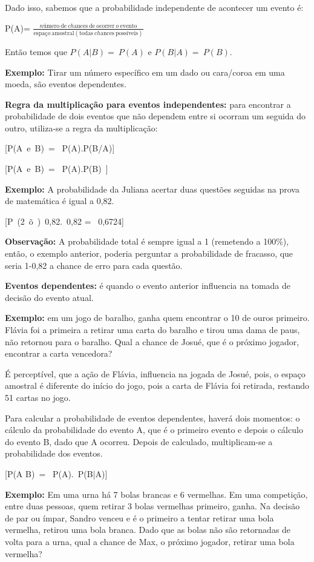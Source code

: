 Dado isso, sabemos que a probabilidade independente de acontecer um
evento é:

P(A)=
\(\frac{nú\text{mero}\ \text{de}\ ch\text{ances}\ \text{de}\ \text{ocorrer}\ o\ \text{evento}}{\text{espa}ço\ \text{amostral}(\text{todas}\ ch\text{ances}\ \text{poss}í\text{veis})}\)

Então temos que \(P(A|B) = \ P(A)\) e \(P(B|A) = \ P(B)\).

\textbf{Exemplo:} Tirar um número específico em um dado ou cara/coroa em
uma moeda, são eventos dependentes.

\textbf{Regra da multiplicação para eventos independentes:} para
encontrar a probabilidade de dois eventos que não dependem entre si
ocorram um seguida do outro, utiliza-se a regra da multiplicação:

[P(A\ e\ B)\  = \ P(A).P(B/A)]

[P(A\ e\ B)\  = \ P(A).P(B)\ ]

\textbf{Exemplo:} A probabilidade da Juliana acertar duas questões
seguidas na prova de matemática é igual a 0,82.

[P\ (2\ õ\ )\ 0,82.\ 0,82 = \ 0,6724]

\textbf{Observação:} A probabilidade total é sempre igual a 1 (remetendo
a 100\%), então, o exemplo anterior, poderia perguntar a probabilidade
de fracasso, que seria 1-0,82 a chance de erro para cada questão.

\textbf{Eventos dependentes:} é quando o evento anterior influencia na
tomada de decisão do evento atual.

\textbf{Exemplo:} em um jogo de baralho, ganha quem encontrar o 10 de
ouros primeiro. Flávia foi a primeira a retirar uma carta do baralho e
tirou uma dama de paus, não retornou para o baralho. Qual a chance de
Josué, que é o próximo jogador, encontrar a carta vencedora?

É perceptível, que a ação de Flávia, influencia na jogada de Josué,
pois, o espaço amostral é diferente do início do jogo, pois a carta de
Flávia foi retirada, restando 51 cartas no jogo.

Para calcular a probabilidade de eventos dependentes, haverá dois
momentos: o cálculo da probabilidade do evento A, que é o primeiro
evento e depois o cálculo do evento B, dado que A ocorreu. Depois de
calculado, multiplicam-se a probabilidade dos eventos.

[P(A \cap B)\  = \ P(A).\ P(B|A)]

\textbf{Exemplo:} Em uma urna há 7 bolas brancas e 6 vermelhas. Em uma
competição, entre duas pessoas, quem retirar 3 bolas vermelhas primeiro,
ganha. Na decisão de par ou ímpar, Sandro venceu e é o primeiro a tentar
retirar uma bola vermelha, retirou uma bola branca. Dado que as bolas
não são retornadas de volta para a urna, qual a chance de Max, o próximo
jogador, retirar uma bola vermelha?

